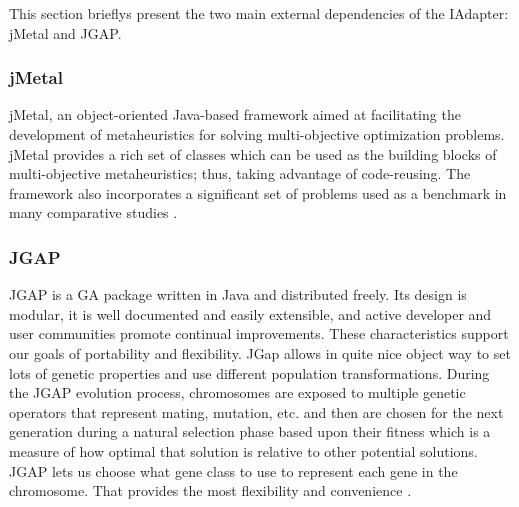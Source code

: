 \documentclass[espaco=umemeio,chapter=TITLE,twoside,openright]{abnt}
\begin{document}
This section brieflys present the two main external dependencies of the IAdapter: jMetal and JGAP.

\subsubsection{jMetal}

jMetal, an object-oriented Java-based framework aimed at facilitating the development of metaheuristics for solving multi-objective optimization problems. jMetal provides
a rich set of classes which can be used as the building blocks of multi-objective metaheuristics; thus, taking advantage of code-reusing. The framework also incorporates a significant set of problems used as a benchmark in many comparative studies \cite{Durillo2006}. 

\subsubsection{JGAP}

JGAP  is a GA package written in Java and distributed freely. Its design is modular, it is well documented and
easily extensible, and active developer and user communities
promote continual improvements. These characteristics support our goals of portability and flexibility. JGap allows in quite nice object way to set lots of genetic properties and use different population transformations. During the JGAP evolution process, chromosomes are exposed to multiple genetic operators that represent mating, mutation, etc. and then are chosen for the next generation during a natural selection phase based upon their fitness which is a measure of how optimal that solution is relative to other potential solutions. JGAP lets us choose what gene class to use to represent each gene in the chromosome. That provides the most flexibility and convenience \cite{Fiebrink2005}.


%

%
\end{document}

